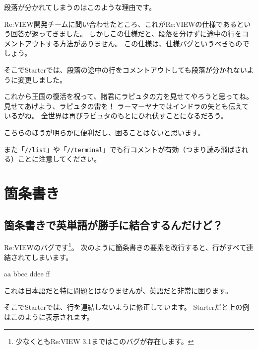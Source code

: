 段落が分かれてしまうのはこのような理由です。

Re:VIEW開発チームに問い合わせたところ、これがRe:VIEWの仕様であるという回答が返ってきました。
しかしこの仕様だと、段落を分けずに途中の行をコメントアウトする方法がありません。
この仕様は、仕様バグというべきものでしょう。

そこでStarterでは、段落の途中の行をコメントアウトしても段落が分かれないように変更しました。

\noindent
{}

\starterresult

これから王国の復活を祝って、諸君にラピュタの力を見せてやろうと思ってね。
見せてあげよう、ラピュタの雷を！
ラーマーヤナではインドラの矢とも伝えているがね。
全世界は再びラピュタのもとにひれ伏すことになるだろう。

\endstarterresult

こちらのほうが明らかに便利だし、困ることはないと思います。

また「\texttt{//list}」や「\texttt{//terminal}」でも行コメントが有効（つまり読み飛ばされる）ことに注意してください。

\section{箇条書き}
\label{sec:2-2}

\subsection{箇条書きで英単語が勝手に結合するんだけど？}
\label{sec:2-2-1}

Re:VIEWのバグです\footnote{少なくともRe:VIEW 3.1まではこのバグが存在します。}。
次のように箇条書きの要素を改行すると、行がすべて連結されてしまいます。

\begin{starterprogram}\end{starterprogram}
\noindent
{}

\starterresult

\begin{starteritemize}
\item aa bbcc ddee ff
\end{starteritemize}

\endstarterresult

これは日本語だと特に問題とはなりませんが、英語だと非常に困ります。

そこでStarterでは、行を連結しないように修正しています。
Starterだと上の例はこのように表示されます。

